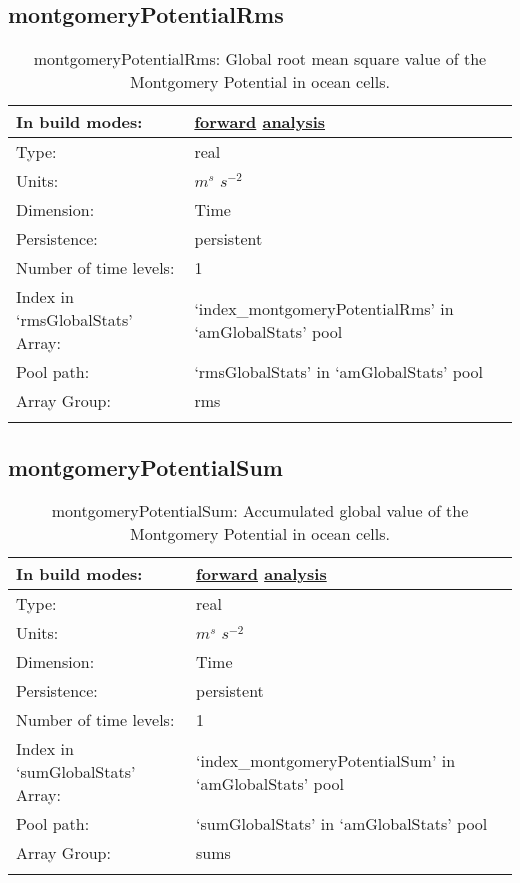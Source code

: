 \subsection[montgomeryPotentialRms]{montgomeryPotentialRms}
\label{subsec:var_sec_amGlobalStats_montgomeryPotentialRms}
\begin{center}
\begin{longtable}{| p{2.0in} | p{4.0in} |}
        \hline 
        In build modes: & \hyperref[subsec:forward_var_tab_amGlobalStats]{forward} \hyperref[subsec:analysis_var_tab_amGlobalStats]{analysis} \\
        \hline 
        Type: & real \\
        \hline 
        Units: & $m^s$ $s^{-2}$ \\
        \hline 
        Dimension: & Time \\
        \hline 
        Persistence: & persistent \\
        \hline 
        Number of time levels: & 1 \\
        \hline 
		 Index in `rmsGlobalStats' Array: & `index\_montgomeryPotentialRms' in `amGlobalStats' pool \\
		 \hline 
            Pool path: & `rmsGlobalStats' in `amGlobalStats' pool \\
		 \hline 
		 Array Group: & rms \\
		 \hline 
    \caption{montgomeryPotentialRms: Global root mean square value of the Montgomery Potential in ocean cells.}
\end{longtable}
\end{center}
\subsection[montgomeryPotentialSum]{montgomeryPotentialSum}
\label{subsec:var_sec_amGlobalStats_montgomeryPotentialSum}
\begin{center}
\begin{longtable}{| p{2.0in} | p{4.0in} |}
        \hline 
        In build modes: & \hyperref[subsec:forward_var_tab_amGlobalStats]{forward} \hyperref[subsec:analysis_var_tab_amGlobalStats]{analysis} \\
        \hline 
        Type: & real \\
        \hline 
        Units: & $m^s$ $s^{-2}$ \\
        \hline 
        Dimension: & Time \\
        \hline 
        Persistence: & persistent \\
        \hline 
        Number of time levels: & 1 \\
        \hline 
		 Index in `sumGlobalStats' Array: & `index\_montgomeryPotentialSum' in `amGlobalStats' pool \\
		 \hline 
            Pool path: & `sumGlobalStats' in `amGlobalStats' pool \\
		 \hline 
		 Array Group: & sums \\
		 \hline 
    \caption{montgomeryPotentialSum: Accumulated global value of the Montgomery Potential in ocean cells.}
\end{longtable}
\end{center}
